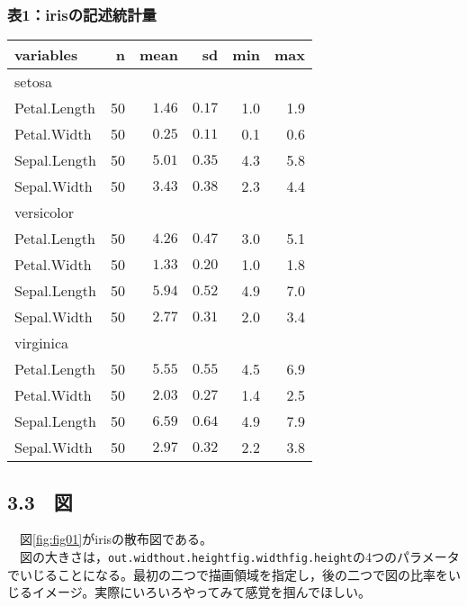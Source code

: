 \documentclass[
  a4paper]{ltjsarticle}
\begin{document}
\begingroup
{}

\hypertarget{ux88681irisux306eux8a18ux8ff0ux7d71ux8a08ux91cf}{%
\subsubsection{表1：irisの記述統計量}\label{ux88681irisux306eux8a18ux8ff0ux7d71ux8a08ux91cf}}

\begin{longtable}{lrrrrr}
\toprule
variables & n & mean & sd & min & max \\ 
\midrule
\multicolumn{6}{l}{setosa} \\ 
\midrule
Petal.Length & 50 & $1.46$ & $0.17$ & 1.0 & 1.9 \\ 
Petal.Width & 50 & $0.25$ & $0.11$ & 0.1 & 0.6 \\ 
Sepal.Length & 50 & $5.01$ & $0.35$ & 4.3 & 5.8 \\ 
Sepal.Width & 50 & $3.43$ & $0.38$ & 2.3 & 4.4 \\ 
\midrule
\multicolumn{6}{l}{versicolor} \\ 
\midrule
Petal.Length & 50 & $4.26$ & $0.47$ & 3.0 & 5.1 \\ 
Petal.Width & 50 & $1.33$ & $0.20$ & 1.0 & 1.8 \\ 
Sepal.Length & 50 & $5.94$ & $0.52$ & 4.9 & 7.0 \\ 
Sepal.Width & 50 & $2.77$ & $0.31$ & 2.0 & 3.4 \\ 
\midrule
\multicolumn{6}{l}{virginica} \\ 
\midrule
Petal.Length & 50 & $5.55$ & $0.55$ & 4.5 & 6.9 \\ 
Petal.Width & 50 & $2.03$ & $0.27$ & 1.4 & 2.5 \\ 
Sepal.Length & 50 & $6.59$ & $0.64$ & 4.9 & 7.9 \\ 
Sepal.Width & 50 & $2.97$ & $0.32$ & 2.2 & 3.8 \\ 
\bottomrule
\end{longtable}

\endgroup

\hypertarget{ux56f3}{%
\subsection{3.3　図}\label{ux56f3}}

　図\ref{fig:fig01}がirisの散布図である。\\
　図の大きさは，\texttt{out.width\textasciigrave{}\textasciigrave{}out.height\textasciigrave{}\textasciigrave{}fig.width\textasciigrave{}\textasciigrave{}fig.height}の4つのパラメータでいじることになる。最初の二つで描画領域を指定し，後の二つで図の比率をいじるイメージ。実際にいろいろやってみて感覚を掴んでほしい。
\end{document}
